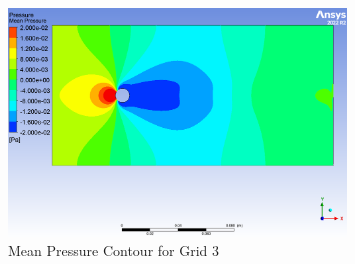 \begin{figure}[H]
    \centering
    \includegraphics[width=0.8\textwidth]{Questions/Figures/mean pressure grid 3.png}
    \caption{Mean Pressure Contour for Grid 3}
\end{figure}

